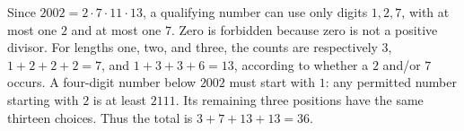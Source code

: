 Since $2002=2\cdot7\cdot11\cdot13$, a qualifying number can use only digits $1,2,7$, with at most one $2$ and at most one $7$. Zero is forbidden because zero is not a positive divisor.
For lengths one, two, and three, the counts are respectively $3$, $1+2+2+2=7$, and $1+3+3+6=13$, according to whether a $2$ and/or $7$ occurs. A four-digit number below $2002$ must start with $1$: any permitted number starting with $2$ is at least $2111$. Its remaining three positions have the same thirteen choices. Thus the total is $\boxed{3+7+13+13=36}$.
